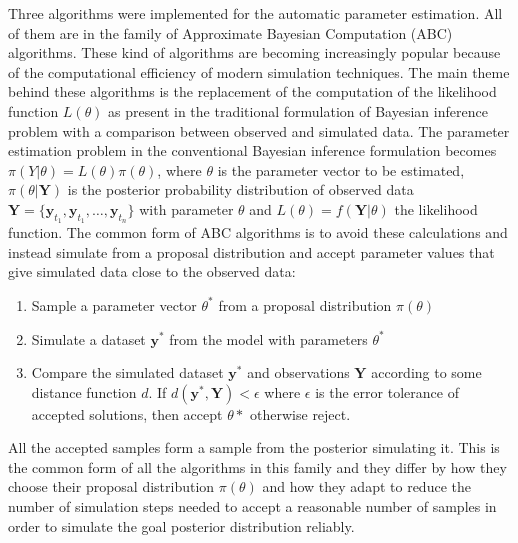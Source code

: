 \documentclass[12pt,a4paper,titlepage]{article}
\begin{document}
Three algorithms were implemented for the automatic parameter estimation. All of them are in the family of Approximate Bayesian Computation (ABC) algorithms. These kind of algorithms are becoming increasingly popular because of the computational efficiency of modern simulation techniques. The main theme behind these algorithms is the replacement of the computation of the likelihood function $L(\theta)$ as present in the traditional formulation of Bayesian inference problem with a comparison between observed and simulated data.  The parameter estimation problem in the conventional Bayesian inference formulation becomes $\pi(Y | \theta) = L(\theta)\pi(\theta)$, where $\theta$ is the parameter vector to be estimated, $\pi(\theta | \mathbf{Y})$ is the posterior probability distribution of observed data $\mathbf{Y} = \{\mathbf{y}_{t_{1}}, \mathbf{y}_{t_{1}}, \dots, \mathbf{y}_{t_{n}}\} $ with parameter $\theta$ and $L(\theta) = f(\mathbf{Y} | \theta)$ the likelihood function. The common form of ABC algorithms is to avoid these calculations and instead simulate from a proposal distribution and accept parameter values that give simulated data close to the observed data:
\begin{enumerate}[noitemsep]
\item{Sample a parameter vector $\theta^*$ from a proposal distribution $\pi(\theta) $}
\item{Simulate a dataset $\mathbf{y}^*$ from the model with parameters $\theta^*$}
\item{Compare the simulated dataset $\mathbf{y}^*$ and observations $\mathbf{Y}$ according to some distance function $d$. If $d(\mathbf{y}^*, \mathbf{Y}) < \epsilon$ where $\epsilon$ is the error tolerance of accepted solutions, then accept $\theta*$ otherwise reject. }
\end{enumerate}
All the accepted samples form a sample from the posterior simulating it. This is the common form of all the algorithms in this family and they differ by how they choose their proposal distribution $\pi(\theta) $ and how they adapt to reduce the number of simulation steps needed to accept a reasonable number of samples in order to simulate the goal posterior distribution reliably.
\end{document}
